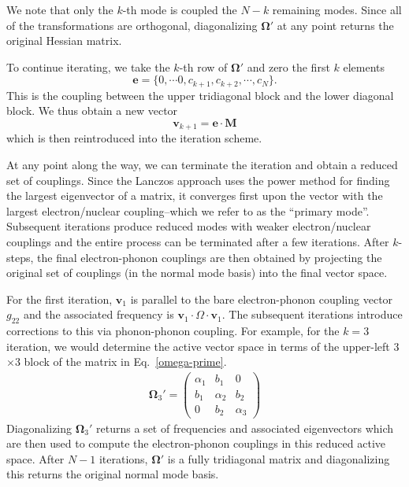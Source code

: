 We note that only the $k$-th mode is coupled the $N-k$ remaining modes.
Since all of the transformations are orthogonal, diagonalizing $\mathbf\Omega'$ at any point
returns the original Hessian matrix.

To continue iterating, we  take the $k$-th row of $\mathbf\Omega'$ and zero the first $k$ elements
$$
{\mathbf e} = \{0,\cdots 0,c_{k+1},c_{k+2},\cdots ,c_{N}\}.
$$
This is the coupling between the upper tridiagonal block and the lower diagonal block.
We thus obtain a new vector
$$
{\mathbf v}_{k+1} = {\mathbf e} \cdot {\mathbf M}
$$
which is then reintroduced into the iteration scheme.

At any point along the way, we can terminate the iteration and obtain a reduced set of
couplings.  Since the  Lanczos approach uses the power method for finding the largest eigenvector of a matrix,
it converges first upon the vector with the largest electron/nuclear coupling--which
 we refer to as the ``primary mode''.  Subsequent iterations produce reduced modes with
 weaker electron/nuclear couplings and the entire  process can be terminated after a few iterations.
After $k$-steps, the final electron-phonon couplings are then obtained by
projecting the original set of couplings (in the normal mode basis) into the final vector space.

For the first iteration, ${\mathbf v}_{1}$ is parallel to the bare electron-phonon coupling vector $g_{22}$
and the associated frequency is ${\mathbf v}_{1}\cdot\Omega\cdot{\mathbf v}_{1}$.   The subsequent iterations introduce
corrections to this via phonon-phonon coupling.  For example, for the $k=3$ iteration,
we would determine the active vector space in terms of the upper-left 3$\times 3$ block of the matrix in
Eq.~\ref{omega-prime}.
\begin{eqnarray}
{\mathbf \Omega}_{3}' =
\begin{pmatrix}
\alpha_{1}   & b_{1}    & 0      \\
b_{1}     & \alpha_{2}  & b_{2}                         \\
0            &   b_{2}         & \alpha_{3}
\end{pmatrix}
\end{eqnarray}
Diagonalizing  ${\mathbf \Omega}_{3}'$ returns a set of frequencies and  associated eigenvectors
which are then used to compute the electron-phonon couplings in this reduced active space.
After $N-1$ iterations, $\mathbf\Omega'$ is a fully tridiagonal matrix and diagonalizing this returns the original
normal mode basis.


